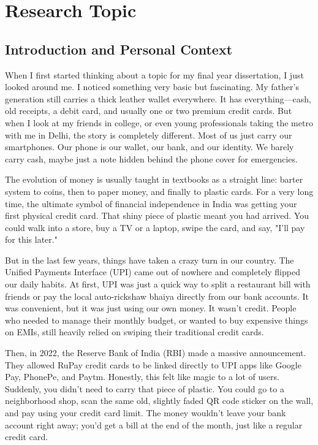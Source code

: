 \chapter{Research Topic}

\section{Introduction and Personal Context}

When I first started thinking about a topic for my final year dissertation, I just looked around me. I noticed something very basic but fascinating. My father's generation still carries a thick leather wallet everywhere. It has everything---cash, old receipts, a debit card, and usually one or two premium credit cards. But when I look at my friends in college, or even young professionals taking the metro with me in Delhi, the story is completely different. Most of us just carry our smartphones. Our phone is our wallet, our bank, and our identity. We barely carry cash, maybe just a  note hidden behind the phone cover for emergencies.

The evolution of money is usually taught in textbooks as a straight line: barter system to coins, then to paper money, and finally to plastic cards. For a very long time, the ultimate symbol of financial independence in India was getting your first physical credit card. That shiny piece of plastic meant you had arrived. You could walk into a store, buy a TV or a laptop, swipe the card, and say, "I'll pay for this later."

But in the last few years, things have taken a crazy turn in our country. The Unified Payments Interface (UPI) came out of nowhere and completely flipped our daily habits. At first, UPI was just a quick way to split a restaurant bill with friends or pay the local auto-rickshaw bhaiya directly from our bank accounts. It was convenient, but it was just using our own money. It wasn't credit. People who needed to manage their monthly budget, or wanted to buy expensive things on EMIs, still heavily relied on swiping their traditional credit cards.

Then, in 2022, the Reserve Bank of India (RBI) made a massive announcement. They allowed RuPay credit cards to be linked directly to UPI apps like Google Pay, PhonePe, and Paytm. Honestly, this felt like magic to a lot of users. Suddenly, you didn't need to carry that piece of plastic. You could go to a neighborhood shop, scan the same old, slightly faded QR code sticker on the wall, and pay using your credit card limit. The money wouldn't leave your bank account right away; you'd get a bill at the end of the month, just like a regular credit card.


